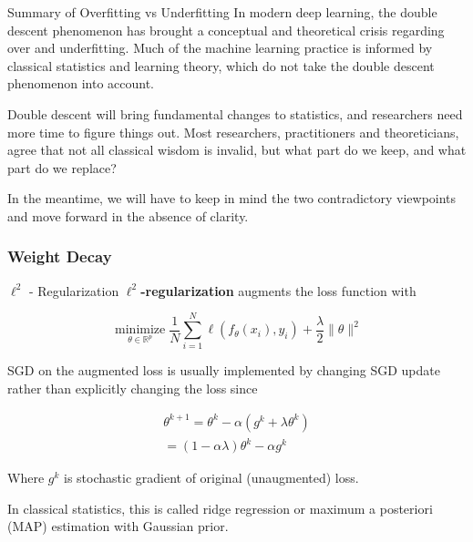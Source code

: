 \begin{frame}[allowframebreaks]

\begin{myconceptblock}{6.8}{Summary of Overfitting vs Underfitting}
    In modern deep learning, the double descent phenomenon has brought a conceptual and theoretical crisis regarding over and underfitting. Much of the machine learning practice is informed by classical statistics and learning theory, which do not take the double descent phenomenon into account.

    Double descent will bring fundamental changes to statistics, and researchers need more time to figure things out. Most researchers, practitioners and theoreticians, agree that not all classical wisdom is invalid, but what part do we keep, and what part do we replace?

    In the meantime, we will have to keep in mind the two contradictory viewpoints and move forward in the absence of clarity.
\end{myconceptblock}

\end{frame}

\subsubsection{Weight Decay}

\begin{frame}[allowframebreaks]

\begin{mydefinitionblock}{6.9}{$\ell^{2}$ - Regularization}
    \textbf{$\ell^{2}$-regularization} augments the loss function with

    $$
    \underset{\theta \in \mathbb{R}^{p}}{\operatorname{minimize}} \frac{1}{N} \sum_{i=1}^{N} \ell\left(f_{\theta}\left(x_{i}\right), y_{i}\right)+\frac{\lambda}{2}\|\theta\|^{2}
    $$

    SGD on the augmented loss is usually implemented by changing SGD update rather than explicitly changing the loss since

    $$
    \begin{gathered}
    \theta^{k+1}=\theta^{k}-\alpha\left(g^{k}+\lambda \theta^{k}\right) \\
    =(1-\alpha \lambda) \theta^{k}-\alpha g^{k}
    \end{gathered}
    $$

    Where $g^{k}$ is stochastic gradient of original (unaugmented) loss.

    In classical statistics, this is called ridge regression or maximum a posteriori (MAP) estimation with Gaussian prior.
\end{mydefinitionblock}

\end{frame}

